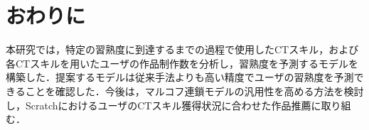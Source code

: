 \documentclass[submit]{ipsj}
\begin{document}

\section{おわりに}\label{sec:conc}

本研究では，特定の習熟度に到達するまでの過程で使用したCTスキル，および各CTスキルを用いたユーザの作品制作数を分析し，習熟度を予測するモデルを構築した．提案するモデルは従来手法よりも高い精度でユーザの習熟度を予測できることを確認した．今後は，マルコフ連鎖モデルの汎用性を高める方法を検討し，ScratchにおけるユーザのCTスキル獲得状況に合わせた作品推薦に取り組む．




\end{document}
